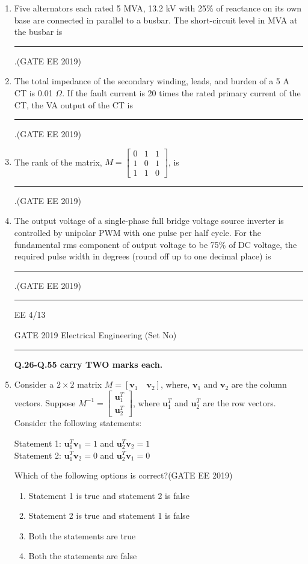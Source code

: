 \documentclass[a4paper,10pt]{exam}
\theoremstyle{remark}
\begin{document}
\begin{enumerate}
\begin{enumerate}[label=\arabic*.]
\item Five alternators each rated 5 MVA, 13.2 kV with 25\% of reactance on its own base are connected in parallel to a busbar. The short-circuit level in MVA at the busbar is \rule{2cm}{0.15mm}.\hfill{(GATE EE 2019)}
\vspace{1cm}
\item The total impedance of the secondary winding, leads, and burden of a 5 A CT is 0.01 $\Omega$. If the fault current is 20 times the rated primary current of the CT, the VA output of the CT is \rule{2cm}{0.15mm}.\hfill{(GATE EE 2019)}
\vspace{0.3cm}
\item The rank of the matrix, $M =  \begin{bmatrix}
0 & 1 & 1\\
1 & 0 & 1\\
1 & 1 & 0
\end{bmatrix}$, is \rule{2cm}{0.15mm}.\hfill{(GATE EE 2019)}
\vspace{0.4cm}

\item The output voltage of a single-phase full bridge voltage source inverter is controlled by unipolar PWM with one pulse per half cycle. For the fundamental rms component of output voltage to be 75\% of DC voltage, the required pulse width in degrees (round off up to one decimal place) is \rule{2cm}{0.15mm}.\hfill{(GATE EE 2019)}
\vfill
\noindent\rule{\linewidth}{0.4pt}
EE \hfill 4/13
\newpage
\raggedright{GATE 2019 Electrical Engineering (Set No)}
\noindent\rule{\linewidth}{0.4pt}
\textbf{Q.26-Q.55 carry TWO marks each.}
\item Consider a $2 \times 2$ matrix $ M = [\mathbf{v}_1 \quad \mathbf{v}_2] $, where, $\mathbf{v}_1$ and $\mathbf{v}_2$ are the column vectors. Suppose $M^{-1} =  \begin{bmatrix} \mathbf{u}_1^T \\ \mathbf{u}_2^T \end{bmatrix}$, where $\mathbf{u}_1^T$ and $\mathbf{u}_2^T$ are the row vectors. Consider the following statements:

Statement 1: $\mathbf{u}_1^T \mathbf{v}_1 = 1$ and $\mathbf{u}_2^T \mathbf{v}_2 = 1$ \\
Statement 2: $\mathbf{u}_1^T \mathbf{v}_2 = 0$ and $\mathbf{u}_2^T \mathbf{v}_1 = 0$

Which of the following options is correct?\hfill{(GATE EE 2019)}

\begin{multicols}{2}
\begin{enumerate}
    \item Statement 1 is true and statement 2 is false
    \item Statement 2 is true and statement 1 is false
    \item Both the statements are true
    \item Both the statements are false
\end{enumerate}
\end{multicols}


\end{enumerate}
\end{enumerate}
\end{document}

